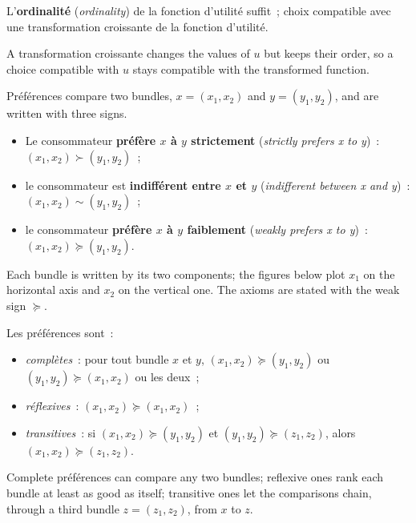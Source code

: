 \begin{prop}
  L'\textbf{ordinalité} (\textit{ordinality}) de la fonction d'utilité suffit~;
  choix compatible avec une transformation croissante de la fonction d'utilité.
\end{prop}

A transformation croissante changes the values of $u$ but keeps their order, so a
choice compatible with $u$ stays compatible with the transformed function.

\begin{notation}
  Préférences compare two bundles, $x = (x_1, x_2)$ and $y = (y_1, y_2)$, and are
  written with three signs.
  \begin{itemize}
    \item Le consommateur \textbf{préfère $x$ à $y$ strictement}
      (\textit{strictly prefers x to y})~: $(x_1, x_2) \succ (y_1, y_2)$~;
    \item le consommateur est \textbf{indifférent entre $x$ et $y$}
      (\textit{indifferent between x and y})~: $(x_1, x_2) \sim (y_1, y_2)$~;
    \item le consommateur \textbf{préfère $x$ à $y$ faiblement}
      (\textit{weakly prefers x to y})~: $(x_1, x_2) \succeq (y_1, y_2)$.
  \end{itemize}
\end{notation}

Each bundle is written by its two components; the figures below plot $x_1$ on the
horizontal axis and $x_2$ on the vertical one. The axioms are stated with the weak
sign $\succeq$.

\begin{definition}[Axiomes]
  Les préférences sont~:
  \begin{itemize}
    \item \emph{complètes}~: pour tout bundle $x$ et $y$,
      $(x_1, x_2) \succeq (y_1, y_2)$ ou $(y_1, y_2) \succeq (x_1, x_2)$ ou les
      deux~;
    \item \emph{réflexives}~: $(x_1, x_2) \succeq (x_1, x_2)$~;
    \item \emph{transitives}~: si $(x_1, x_2) \succeq (y_1, y_2)$ et
      $(y_1, y_2) \succeq (z_1, z_2)$, alors $(x_1, x_2) \succeq (z_1, z_2)$.
  \end{itemize}
\end{definition}

Complete préférences can compare any two bundles; reflexive ones rank each bundle
at least as good as itself; transitive ones let the comparisons chain, through a
third bundle $z = (z_1, z_2)$, from $x$ to $z$.\\

